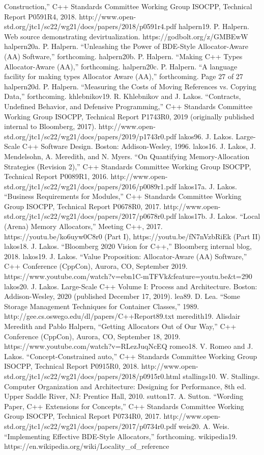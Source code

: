 Construction,” C++ Standards Committee Working Group ISOCPP, Technical
Report P0591R4, 2018.
http://www.open-std.org/jtc1/sc22/wg21/docs/papers/2018/p0591r4.pdf
halpern19. P. Halpern. Web source demonstrating devirtualization.
https://godbolt.org/z/GMBEwW
halpern20a. P. Halpern. “Unleashing the Power of BDE-Style Allocator-Aware (AA)
Software,” forthcoming.
halpern20b. P. Halpern. “Making C++ Types Allocator-Aware (AA),” forthcoming.
halpern20c. P. Halpern. “A language facility for making types Allocator Aware (AA),”
forthcoming.
Page 27 of 27
halpern20d. P. Halpern. “Measuring the Costs of Moving References vs. Copying
Data,” forthcoming.
khlebnikov19. R. Khlebnikov and J. Lakos. “Contracts, Undefined Behavior, and
Defensive Programming,” C++ Standards Committee Working Group ISOCPP,
Technical Report P1743R0, 2019 (originally published internal to Bloomberg,
2017).
http://www.open-std.org/jtc1/sc22/wg21/docs/papers/2019/p1743r0.pdf
lakos96. J. Lakos. Large-Scale C++ Software Design. Boston: Addison-Wesley, 1996.
lakos16. J. Lakos, J. Mendelsohn, A. Meredith, and N. Myers. “On Quantifying
Memory-Allocation Strategies (Revision 2),” C++ Standards Committee Working
Group ISOCPP, Technical Report P0089R1, 2016.
http://www.open-std.org/jtc1/sc22/wg21/docs/papers/2016/p0089r1.pdf
lakos17a. J. Lakos. “Business Requirements for Modules,” C++ Standards
Committee Working Group ISOCPP, Technical Report P0678R0, 2017.
http://www.open-std.org/jtc1/sc22/wg21/docs/papers/2017/p0678r0.pdf
lakos17b. J. Lakos. “Local (Arena) Memory Allocators,” Meeting C++, 2017.
https://youtu.be/ko6uyw0C8r0 (Part I),
https://youtu.be/fN7nVzbRiEk (Part II)
lakos18. J. Lakos. “Bloomberg 2020 Vision for C++,” Bloomberg internal blog, 2018.
lakos19. J. Lakos. “Value Proposition: Allocator-Aware (AA) Software,” C++
Conference (CppCon), Aurora, CO, September 2019.
https://www.youtube.com/watch?v=ebn1C-mTFVk&feature=youtu.be&t=290
lakos20. J. Lakos. Large-Scale C++ Volume I: Process and Architecture. Boston:
Addison-Wesley, 2020 (published December 17, 2019).
lea89. D. Lea. “Some Storage Management Techniques for Container Classes,” 1989.
http://gee.cs.oswego.edu/dl/papers/C++Report89.txt
meredith19. Alisdair Meredith and Pablo Halpern, “Getting Allocators Out of Our
Way,” C++ Conference (CppCon), Aurora, CO, September 18, 2019.
https://www.youtube.com/watch?v=RLezJuqNcEQ
romeo18. V. Romeo and J. Lakos. “Concept-Constrained auto,” C++ Standards
Committee Working Group ISOCPP, Technical Report P0915R0, 2018.
http://www.open-std.org/jtc1/sc22/wg21/docs/papers/2018/p0915r0.html
stallings10. W. Stallings. Computer Organization and Architecture: Designing for
Performance, 8th ed. Upper Saddle River, NJ: Prentice Hall, 2010.
sutton17. A. Sutton. “Wording Paper, C++ Extensions for Concepts,” C++ Standards
Committee Working Group ISOCPP, Technical Report P0734R0, 2017.
http://www.open-std.org/jtc1/sc22/wg21/docs/papers/2017/p0734r0.pdf
weis20. A. Weis. “Implementing Effective BDE-Style Allocators,” forthcoming.
wikipedia19. https://en.wikipedia.org/wiki/Locality_of_reference
